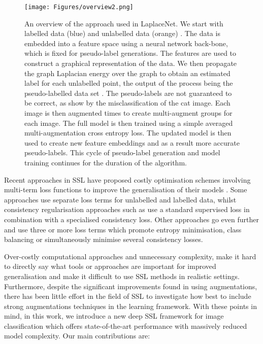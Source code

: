 \documentclass[journal]{IEEEtran}
\begin{document}
\begin{figure*}[ht]
	\centering
    \texttt{[image: Figures/overview2.png]}
	\caption{An overview of the approach used in LaplaceNet. 
		We start with labelled data (blue)  and unlabelled data (orange) . The data is embedded into a feature space using a neural network back-bone, which is fixed for pseudo-label generations. The features are used to construct a graphical representation of the data. We then propagate the graph Laplacian energy over the graph to obtain an estimated label for each unlabelled point, the output of the process being  the pseudo-labelled data set . The pseudo-labels  are not guaranteed to be correct, as show by the misclassification of the cat image. Each image is then augmented  times to create multi-augment groups for each image. The full model is then trained using a simple averaged multi-augmentation cross entropy loss. The updated model is then used to create new feature embeddings and as a result more accurate pseudo-labels. This cycle of pseudo-label generation and model training continues for the duration of the algorithm.} 
	\label{fig::plv}
\end{figure*}


Recent approaches in SSL have proposed costly optimisation schemes involving multi-term loss functions to improve the generalisation of their models \cite{remixmatch,arazo2019pseudo}. Some approaches \cite{sohn2020fixmatch} use separate loss terms for unlabelled and labelled data, whilst consistency regularisation approaches such as \cite{xie2019unsupervised} use a standard supervised loss in combination with a specialised consistency loss. Other approaches go even further \cite{arazo2019pseudo,remixmatch} and use three or more loss terms which promote entropy minimisation, class balancing or simultaneously minimise several consistency losses.

Over-costly computational approaches and unnecessary complexity, make it hard to directly say what tools or approaches are important for improved generalisation and make it difficult to use SSL methods in realistic settings.  Furthermore, despite the significant improvements found in using augmentations, there has been little effort in the field of SSL to investigate how best to include strong augmentations techniques in the learning framework. With these points in mind, in this work, we introduce a new deep SSL framework for image classification which offers state-of-the-art performance with massively reduced model complexity.  Our main contributions are:
\end{document}
